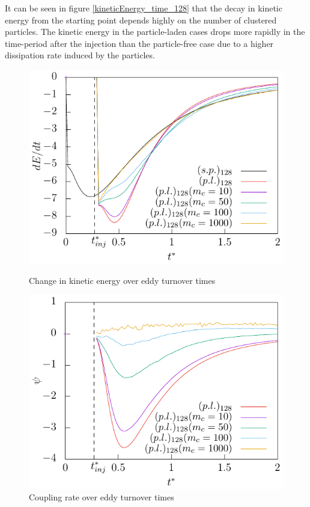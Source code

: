 \documentclass[11pt,a4paper,openany,oneside,parskip=half*]{article}
\begin{document}
It can be seen in figure \ref{kineticEnergy_time_128} that the decay in kinetic energy from the starting point depends highly on the number of clustered particles. The kinetic energy in the particle-laden cases drops more rapidly in the time-period after the injection than the particle-free case due to a higher dissipation rate induced by the particles. 
\begin{figure}[h]
    \centering
    \begin{minipage}{.5\textwidth}
        \centering
        \includegraphics[width=\linewidth]{./Abbildungen/128/der(kineticEnergy)_time.pdf}
        \caption{Change in kinetic energy over eddy turnover times}
        \label{der(kineticEnergy)_time_128}
    \end{minipage}%
    \begin{minipage}{0.5\textwidth}
        \centering
        \includegraphics[width=\linewidth]{./Abbildungen/128/coupling_time.pdf}
        \caption{Coupling rate over eddy turnover times}
        \label{coupling_time_128}
    \end{minipage}
\end{figure}
\end{document}
